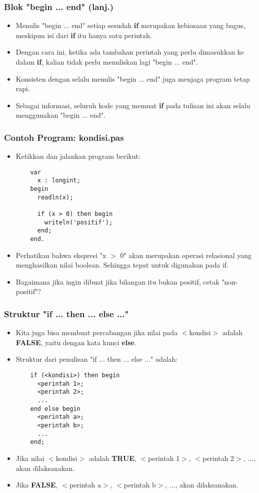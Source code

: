 \documentclass{beamer}
\begin{document}
\begin{frame}[fragile]
\frametitle{Blok "begin ... end" (lanj.)}
\begin{itemize}
  \item Menulis "begin ... end" setiap sesudah \textbf{if} merupakan kebiasaan yang bagus, meskipun isi dari \textbf{if} itu hanya satu perintah.
  \item Dengan cara ini, ketika ada tambahan perintah yang perlu dimasukkan ke dalam \textbf{if}, kalian tidak perlu menuliskan lagi "begin ... end".
  \item Konsisten dengan selalu menulis "begin ... end" juga menjaga program tetap rapi.
  \item Sebagai informasi, seluruh kode yang memuat \textbf{if} pada tulisan ini akan selalu menggunakan "begin ... end".
\end{itemize}
\end{frame}

\begin{frame}[fragile]
\frametitle{Contoh Program: kondisi.pas}
\begin{itemize}
  \item Ketikkan dan jalankan program berikut:
  \begin{lstlisting}
    var
      x : longint;
    begin
      readln(x);

      if (x > 0) then begin
        writeln('positif');
      end;
    end.
  \end{lstlisting}
  \item Perhatikan bahwa ekspresi "x $>$ 0" akan merupakan operasi relasional yang menghasilkan nilai boolean. Sehingga tepat untuk digunakan pada if.
  \item Bagaimana jika ingin dibuat jika bilangan itu bukan positif, cetak "non-positif"?
\end{itemize}
\end{frame}

\begin{frame}[fragile]
\frametitle{Struktur "if ... then ... else ..."}
\begin{itemize}
  \item Kita juga bisa membuat percabangan jika nilai pada $<$kondisi$>$ adalah \textbf{FALSE}, yaitu dengan kata kunci \textbf{else}.
  \item Struktur dari penulisan "if ... then ... else ..." adalah:
  \begin{lstlisting}
    if (<kondisi>) then begin
      <perintah 1>;
      <perintah 2>;
      ...
    end else begin
      <perintah a>;
      <perintah b>;
      ...
    end;
  \end{lstlisting}

  \item Jika nilai $<$kondisi$>$ adalah \textbf{TRUE}, $<$perintah 1$>$, $<$perintah 2$>$, ..., akan dilaksanakan.
  \item Jika \textbf{FALSE}, $<$perintah a$>$, $<$perintah b$>$, ..., akan dilaksanakan.
\end{itemize}
\end{frame}
\end{document}
